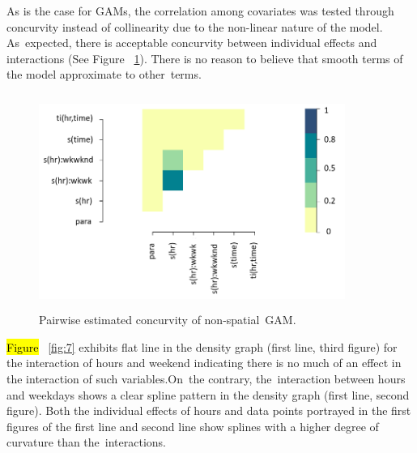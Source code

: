 \documentclass[energies,article,accept,pdftex,moreauthors]{Definitions/mdpi}
\begin{document}
    As is the case for GAMs, the correlation among covariates was tested through concurvity instead of collinearity due to the non-linear nature of the model. As~expected, there is acceptable concurvity between individual effects and interactions (See Figure ~\ref{fig:6}). There is no reason to believe that smooth terms of the model approximate to other~terms. 

    \begin{figure}[H]
   \centering
		\includegraphics[height=7cm, width=10cm]{figs/Pairwise_Estimated_Concurvity.png}
	\caption{Pairwise estimated concurvity of non-spatial~GAM.\label{fig:6}}
    \end{figure} 

    \hl{Figure}%
    ~\ref{fig:7} exhibits flat line in the density graph (first line, third figure) for the interaction of hours and weekend indicating there is no much of an effect in the interaction of such variables.On~the contrary, the~interaction between hours and weekdays shows a clear spline pattern in the density graph (first line, second figure). Both the individual effects of hours and data points portrayed in the first figures of the first line and second line show splines with a higher degree of curvature than the~interactions. 
\end{document}
